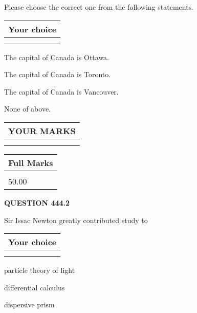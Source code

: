 \documentclass[12pt]{article}
\begin{document}
  
Please choose the correct one from the following statements.
  
  
\noindent\hspace{3.0in} \begin{tabular}{|l|}
\hline
Your choice \\
\hline
 \\ 
 \\ 
\hline
\end{tabular}
  
  
 
 
The capital of Canada is Ottawa.
 
 
The capital of Canada is Toronto.
 
 
The capital of Canada is Vancouver.
 
 
 None of above.
 
 
  
\vspace{0.2in}
  
\noindent\begin{tabular}{|l|}
\hline
 YOUR MARKS  \\
\hline
 \\ 
 \\ 
\hline
\end{tabular}
\hspace{0.05in} \begin{tabular}{|l|}
\hline
 Full Marks  \\
\hline
 \\ 
50.00 \\
\hline
\end{tabular}
{\textbf{\Large{QUESTION
444.2 
}}}
  
  
Sir Issac Newton greatly contributed study to
  
  
\noindent\hspace{3.0in} \begin{tabular}{|l|}
\hline
Your choice \\
\hline
 \\ 
 \\ 
\hline
\end{tabular}
  
  
 
 
particle theory of light
 
 
differential calculus
 
 
dispersive prism
 
\end{document}
